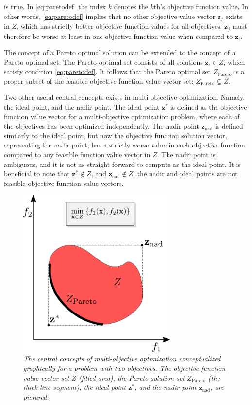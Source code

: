 is true. In \eqref{eq:paretodef} the index $k$ denotes the $k$th's objective function value. In other
words, \eqref{eq:paretodef} implies that no other objective value vector $\mathbf{z}_j$ exists in
$Z$, which has strictly better objective function values for all objectives. $\mathbf{z}_j$ must
therefore be worse at least in one objective function value when compared to $\mathbf{z}_i$.

The concept of a Pareto optimal solution can be extended to the concept of a  Pareto optimal set.
The Pareto optimal
set consists of all solutions $\mathbf{z}_i \in Z$, which satisfy condition \eqref{eq:paretodef}.
It follows that the Pareto optimal set $Z_{\text{Pareto}}$ is a proper subset of the feasible
objective function value vector set: $Z_{\text{Pareto}} \subseteq Z$.

Two other useful central concepts exists in multi-objective optimization. Namely, the ideal point, and
the nadir point. The ideal point $\mathbf{z}^*$ is defined as the objective function value vector
for a multi-objective optimization problem, where each of the objectives has been optimized
independently. The nadir point $\mathbf{z}_{\text{nad}}$
is defined similarly to the ideal point, but now the objective function
solution vector, representing the nadir point,
has a strictly worse value in each objective function compared to any feasible function
value vector in $Z$. The nadir point is ambiguous, and it is not as straight forward to compute as the
ideal point. It is beneficial to note that $\mathbf{z}^* \notin Z$, and $\mathbf{z}_{\text{nad}}
\notin Z$; the nadir and ideal points are not feasible objective function value vectors.

\begin{figure}[t]
    \centering
    \includegraphics[width=8cm]{contents/moo_concepts.png}
    \caption{\emph{The central concepts of multi-objective optimization conceptualized graphically for a problem with two objectives. The objective function value vector set $Z$
    (filled area), the
    Pareto solution set $Z_{\text{Pareto}}$ (the thick line segment), the ideal point $\mathbf{z}^*$, and the nadir point $\mathbf{z}_{\text{nad}}$, are pictured.
    }}
    \label{fig:moo_concepts}
\end{figure}

